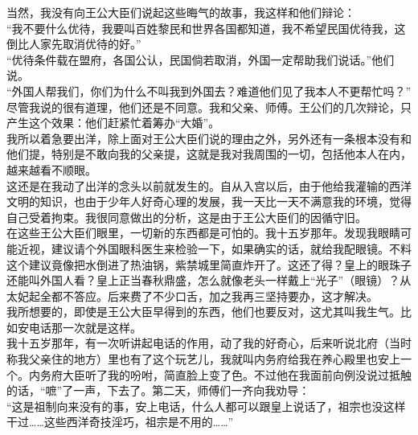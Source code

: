 当然，我没有向王公大臣们说起这些晦气的故事，我这样和他们辩论：\\

“我不要什么优待，我要叫百姓黎民和世界各国都知道，我不希望民国优待我，这倒比人家先取消优待的好。”\\

“优待条件载在盟府，各国公认，民国倘若取消，外国一定帮助我们说话。”他们说。\\

“外国人帮我们，你们为什么不叫我到外国去？难道他们见了我本人不更帮忙吗？”\\

尽管我说的很有道理，他们还是不同意。我和父亲、师傅。王公们的几次辩论，只产生这个效果：他们赶紧忙着筹办“大婚”。\\

我所以着急要出洋，除上面对王公大臣们说的理由之外，另外还有一条根本没有和他们提，特别是不敢向我的父亲提，这就是我对我周围的一切，包括他本人在内，越来越看不顺眼。\\

这还是在我动了出洋的念头以前就发生的。自从入宫以后，由于他给我灌输的西洋文明的知识，也由于少年人好奇心理的发展，我一天比一天不满意我的环境，觉得自己受着拘束。我很同意做出的分析，这是由于王公大臣们的因循守旧。\\

在这些王公大臣们眼里，一切新的东西都是可怕的。我十五岁那年。发现我眼睛可能近视，建议请个外国眼科医生来检验一下，如果确实的话，就给我配眼镜。不料这个建议竟像把水倒进了热油锅，紫禁城里简直炸开了。这还了得？皇上的眼珠子还能叫外国人看？皇上正当春秋鼎盛，怎么就像老头一样戴上“光子”（眼镜）？从太妃起全都不答应。后来费了不少口舌，加之我再三坚持要办，这才解决。\\

我所想要的，即使是王公大臣早得到的东西，他们也要反对，这尤其叫我生气。比如安电话那一次就是这样。\\

我十五岁那年，有一次听讲起电话的作用，动了我的好奇心，后来听说北府（当时称我父亲住的地方）里也有了这个玩艺儿，我就叫内务府给我在养心殿里也安上一个。内务府大臣听了我的吩咐，简直脸上变了色。不过他在我面前向例没说过抵触的话，“嗻”了一声，下去了。第二天，师傅们一齐向我劝导：\\

“这是祖制向来没有的事，安上电话，什么人都可以跟皇上说话了，祖宗也没这样干过……这些西洋奇技淫巧，祖宗是不用的……”\\

